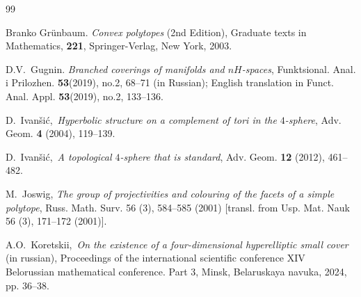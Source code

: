 \documentclass[12pt]{amsart}
\theoremstyle{definition}
\theoremstyle{remark}
\begin{document}
\begin{thebibliography}{99}


Branko Gr\"{u}nbaum. 
\emph{Convex polytopes} (2nd Edition), 
Graduate texts in Mathematics, {\bf 221}, Springer-Verlag, New York, 2003.

D.V.~Gugnin. 
\emph{Branched coverings of manifolds and $nH$-spaces},
Funktsional. Anal. i Prilozhen. {\bf 53}(2019), no.2, 68--71 (in Russian); English translation in
Funct. Anal. Appl. {\bf 53}(2019), no.2, 133--136.


D.~Ivan\v{s}i\'c,\,
\emph{Hyperbolic structure on a complement of tori in the $4$-sphere},
Adv. Geom. {\bf 4} (2004), 119--139.

D.~Ivan\v{s}i\'c,\,
\emph{A topological $4$-sphere that is standard},
Adv. Geom. {\bf 12} (2012), 461--482.




M.~Joswig, 
\emph{The group of projectivities and colouring of the facets of a simple polytope},
Russ. Math. Surv. 56 (3), 584--585 (2001) [transl. from Usp. Mat. Nauk 56 (3), 171--172 (2001)].



A.O.~Koretskii,\,
\emph{On the existence of a four-dimensional hyperelliptic small cover} (in russian),
Proceedings of the international scientific conference XIV Belorussian mathematical conference. Part 3, Minsk,
Belaruskaya navuka, 2024, pp. 36--38.



\end{thebibliography}
\end{document}
